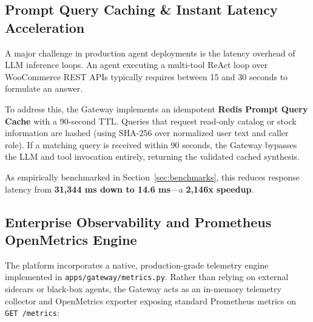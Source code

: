 \documentclass[11pt,a4paper]{article}
\begin{document}
\subsection{Prompt Query Caching \& Instant Latency Acceleration}
A major challenge in production agent deployments is the latency overhead of LLM inference loops. An agent executing a multi-tool ReAct loop over WooCommerce REST APIs typically requires between 15 and 30 seconds to formulate an answer.

To address this, the Gateway implements an idempotent \textbf{Redis Prompt Query Cache} with a 90-second TTL. Queries that request read-only catalog or stock information are hashed (using SHA-256 over normalized user text and caller role). If a matching query is received within 90 seconds, the Gateway bypasses the LLM and tool invocation entirely, returning the validated cached synthesis. 

As empirically benchmarked in Section~\ref{sec:benchmarks}, this reduces response latency from \textbf{31,344 ms down to 14.6 ms}---a \textbf{2,146x speedup}.

\subsection{Enterprise Observability and Prometheus OpenMetrics Engine}
The platform incorporates a native, production-grade telemetry engine implemented in \texttt{apps/gateway/metrics.py}. Rather than relying on external sidecars or black-box agents, the Gateway acts as an in-memory telemetry collector and OpenMetrics exporter exposing standard Prometheus metrics on \texttt{GET /metrics}:
\end{document}
